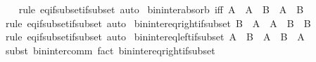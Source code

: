 \begin{isabellebody}
%
\isadelimproof
\ \ %
\endisadelimproof
%
\isatagproof
{}\isamarkupfalse%
\ {\isacharparenleft}{\kern0pt}rule\ eq{\isacharunderscore}{\kern0pt}if{\isacharunderscore}{\kern0pt}subset{\isacharunderscore}{\kern0pt}if{\isacharunderscore}{\kern0pt}subset{\isacharparenright}{\kern0pt}\ auto%
\endisatagproof
{\isafoldproof}%
%
\isadelimproof
\isanewline
%
\endisadelimproof
\isanewline
{}\isamarkupfalse%
\ bin{\isacharunderscore}{\kern0pt}inter{\isacharunderscore}{\kern0pt}absorb\ {\isacharbrackleft}{\kern0pt}iff{\isacharbrackright}{\kern0pt}{\isacharcolon}{\kern0pt}\ {\isachardoublequoteopen}A\ {\isasyminter}\ {\isacharparenleft}{\kern0pt}A\ {\isasyminter}\ B{\isacharparenright}{\kern0pt}\ {\isacharequal}{\kern0pt}\ A\ {\isasyminter}\ B{\isachardoublequoteclose}\isanewline
%
\isadelimproof
\ \ %
\endisadelimproof
%
\isatagproof
{}\isamarkupfalse%
\ {\isacharparenleft}{\kern0pt}rule\ eq{\isacharunderscore}{\kern0pt}if{\isacharunderscore}{\kern0pt}subset{\isacharunderscore}{\kern0pt}if{\isacharunderscore}{\kern0pt}subset{\isacharparenright}{\kern0pt}\ auto%
\endisatagproof
{\isafoldproof}%
%
\isadelimproof
\isanewline
%
\endisadelimproof
\isanewline
{}\isamarkupfalse%
\ bin{\isacharunderscore}{\kern0pt}inter{\isacharunderscore}{\kern0pt}eq{\isacharunderscore}{\kern0pt}right{\isacharunderscore}{\kern0pt}if{\isacharunderscore}{\kern0pt}subset{\isacharcolon}{\kern0pt}\ {\isachardoublequoteopen}B\ {\isasymsubseteq}\ A\ {\isasymLongrightarrow}\ A\ {\isasyminter}\ B\ {\isacharequal}{\kern0pt}\ B{\isachardoublequoteclose}\isanewline
%
\isadelimproof
\ \ %
\endisadelimproof
%
\isatagproof
{}\isamarkupfalse%
\ {\isacharparenleft}{\kern0pt}rule\ eq{\isacharunderscore}{\kern0pt}if{\isacharunderscore}{\kern0pt}subset{\isacharunderscore}{\kern0pt}if{\isacharunderscore}{\kern0pt}subset{\isacharparenright}{\kern0pt}\ auto%
\endisatagproof
{\isafoldproof}%
%
\isadelimproof
\isanewline
%
\endisadelimproof
\isanewline
{}\isamarkupfalse%
\ bin{\isacharunderscore}{\kern0pt}inter{\isacharunderscore}{\kern0pt}eq{\isacharunderscore}{\kern0pt}left{\isacharunderscore}{\kern0pt}if{\isacharunderscore}{\kern0pt}subset{\isacharcolon}{\kern0pt}\ {\isachardoublequoteopen}A\ {\isasymsubseteq}\ B\ {\isasymLongrightarrow}\ A\ {\isasyminter}\ B\ {\isacharequal}{\kern0pt}\ A{\isachardoublequoteclose}\isanewline
%
\isadelimproof
\ \ %
\endisadelimproof
%
\isatagproof
{}\isamarkupfalse%
\ {\isacharparenleft}{\kern0pt}subst\ bin{\isacharunderscore}{\kern0pt}inter{\isacharunderscore}{\kern0pt}comm{\isacharparenright}{\kern0pt}\ {\isacharparenleft}{\kern0pt}fact\ bin{\isacharunderscore}{\kern0pt}inter{\isacharunderscore}{\kern0pt}eq{\isacharunderscore}{\kern0pt}right{\isacharunderscore}{\kern0pt}if{\isacharunderscore}{\kern0pt}subset{\isacharparenright}{\kern0pt}%

\end{isabellebody}
